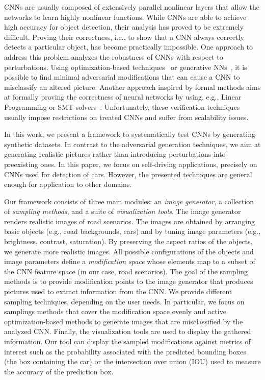 \documentclass[10pt,journal,cspaper,final,twocolumn,compsoc]{./IEEEtran}
\begin{document}
CNNs are usually composed of extensively parallel nonlinear layers that 
allow the networks to learn highly nonlinear functions. While CNNs
are able to achieve high accuracy for object detection, their analysis has proved to be
extremely difficult. Proving their correctness, i.e.,
to show that a CNN always correctly detects a particular object, has become practically impossible. 
One approach to address this problem analyzes the robustness of CNNs with respect to perturbations.
Using optimization-based techniques~\cite{szegedy2013intriguing, papernot2016limitations} or generative NNs~\cite{goodfellow2014generative},
it is possible to find minimal adversarial modifications that can cause a CNN to misclassify an altered picture.
Another approach inspired by formal methods aims at formally proving the correctness of neural networks by using, e.g., Linear Programming or SMT solvers~\cite{huang2016safety, katz2017reluplex}.
Unfortunately, these verification techniques usually impose restrictions on treated CNNs and suffer from scalability issues.


In this work, we present a framework to
systematically test CNNs by generating synthetic datasets.
In contrast to the
adversarial generation techniques, we aim at generating realistic 
pictures rather than introducing perturbations into preexisting ones. In this paper,
we focus on self-driving applications, precisely on CNNs used for detection
of cars. However, the presented techniques are general enough for application to other domains.

Our framework consists of three main modules: an \emph{image generator},
a collection of \emph{sampling methods}, and a suite of \emph{visualization tools}.
The image generator renders realistic images of road scenarios.
The images are obtained by arranging basic objects
(e.g., road backgrounds, cars) and by tuning
image parameters (e.g., brightness, contrast, saturation). By preserving the aspect ratios of the objects, we generate more realistic images. 
All possible configurations of the objects and image parameters define a \emph{modification space} whose elements map to a subset of the CNN feature space (in our case, road scenarios).
The goal of the sampling methods is to provide modification points
to the image generator that produces pictures used to 
extract information from the CNN. We provide different sampling techniques, depending on the 
user needs. In particular, we focus on samplings methods
that cover the modification space evenly and active optimization-based methods to generate images that are misclassified by the analyzed CNN.
Finally, the visualization tools are used to display the gathered information.
Our tool can display the sampled modifications against metrics of interest such as 
the probability associated with the predicted bounding boxes (the box containing the car) or the intersection over union
(IOU) used to measure the accuracy of the prediction box.
\end{document}

